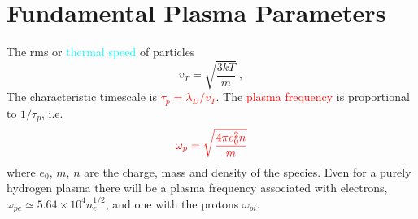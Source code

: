 \documentclass[12pt,a4paper]{article}
\begin{document}
\section{Fundamental Plasma Parameters}
\cite{2015bps..book.....C} The rms or \textcolor{cyan}{thermal speed} of particles
\begin{equation*}
v_T = \sqrt{\frac{3kT}{m}} ~,
\end{equation*}
The characteristic timescale is \textcolor{red}{$\tau_p = \lambda_D/v_T$}. The \textcolor{red}{plasma frequency} is proportional to $1/\tau_p$, i.e.
\begin{equation}
\color{red} \omega_p  = \sqrt{\frac{4\pi e_0^2 n}{m}}
\end{equation}
where $e_0$, $m$, $n$ are the charge, mass and density of the species. Even for a purely hydrogen plasma there will be a plasma frequency associated with electrons, $\omega_{pe} \simeq 5.64\times 10^4 n_e^{1/2}$, and one with the protons $\omega_{pi}$. 
\end{document}
